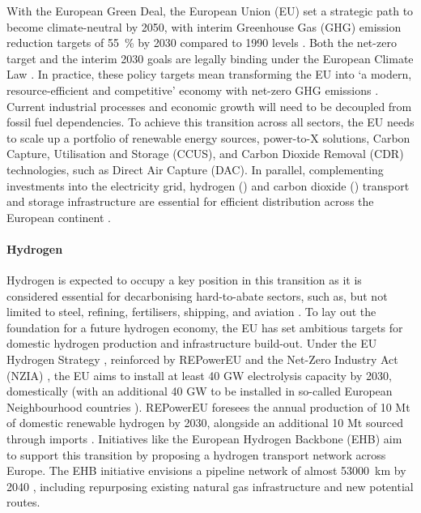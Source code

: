 \documentclass[preprint,12pt,sort&compress]{elsarticle}
\begin{document}
With the European Green Deal, the European Union (EU) set a strategic path to become climate-neutral by 2050, with interim Greenhouse Gas (GHG) emission reduction targets of \SI{55}{\percent} by 2030 compared to 1990 levels \cite{europeancommissionFit55Delivering2021}. Both the net-zero target and the interim 2030 goals are legally binding under the European Climate Law \cite{europeanparliamentRegulationEU20212021}. In practice, these policy targets mean transforming the EU into `a modern, resource-efficient and competitive' economy with net-zero GHG emissions \cite{europeancommissionEuropeanGreenDeal2021}. Current industrial processes and economic growth will need to be decoupled from fossil fuel dependencies. To achieve this transition across all sectors, the EU needs to scale up a portfolio of renewable energy sources, power-to-X solutions, Carbon Capture, Utilisation and Storage (CCUS), and Carbon Dioxide Removal (CDR) technologies, such as Direct Air Capture (DAC). In parallel, complementing investments into the electricity grid, hydrogen () and carbon dioxide () transport and storage infrastructure are essential for efficient distribution across the European continent \cite{hofmannH2CO2Network2025}.

\paragraph{Hydrogen}
Hydrogen is expected to occupy a key position in this transition as it is considered essential for decarbonising hard-to-abate sectors, such as, but not limited to steel, refining, fertilisers, shipping, and aviation \cite{beresWillHydrogenSynthetic2024,neumannPotentialRoleHydrogen2023}. To lay out the foundation for a future hydrogen economy, the EU has set ambitious targets for domestic hydrogen production and infrastructure build-out. Under the EU Hydrogen Strategy \cite{europeancommissionCommunicationCommissionEuropean2020}, reinforced by REPowerEU \cite{europeancommissionREPowerEUPlanCommunication2022} and the Net-Zero Industry Act (NZIA) \cite{europeanparliamentRegulationEU20242024}, the EU aims to install at least 40 GW electrolysis capacity by 2030, domestically (with an additional 40 GW to be installed in so-called European Neighbourhood countries \cite{europeanparliamentRegulationEU20212021a}). REPowerEU foresees the annual production of 10 Mt of domestic renewable hydrogen by 2030, alongside an additional 10 Mt sourced through imports \cite{europeancommissionREPowerEUPlanCommunication2022}. Initiatives like the European Hydrogen Backbone (EHB) aim to support this transition by proposing a hydrogen transport network across Europe. The EHB initiative envisions a  pipeline network of almost \SI{53000}{km} by 2040 \cite{europeanhydrogenbackboneinitiativeEuropeanHydrogenBackbone2022}, including repurposing existing natural gas infrastructure and new potential routes.
\end{document}
